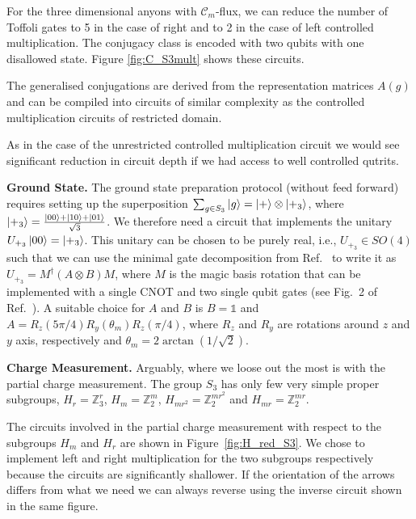 \documentclass[two column]{article}
\begin{document}
For the three dimensional anyons with $\mathcal{C}_m$-flux, we can reduce the number of Toffoli gates to 5 in the case of right and to 2 in the case of left controlled multiplication. The conjugacy class is encoded with two qubits with one disallowed state. Figure \ref{fig:C_S3mult} shows these circuits.

The generalised conjugations are derived from the representation matrices $A{(g)}$ and can be compiled into circuits of similar complexity as the controlled multiplication circuits of restricted domain.

As in the case of the unrestricted controlled multiplication circuit we would see significant reduction in circuit depth if we had access to well controlled qutrits.

\textbf{Ground State.}
The ground state preparation protocol (without feed forward) requires setting up the superposition $\sum_{g \in S_3} \ket{g}=\ket{+}\otimes \ket{+_3}$, where $\ket{+_3}=\frac{\ket{00}+\ket{10}+\ket{01}}{{\sqrt{3}} }$. We therefore need a circuit that implements the unitary $U_{+_3}\ket{00}= \ket{+_3}$. This unitary can be chosen to be purely real, i.e., $U_{+_3}\in SO(4)$ such that we can use the minimal gate decomposition from Ref.~\cite{decomp} to write it as $U_{+_3}=M^\dag(A\otimes B)M$, where $M$ is the magic basis rotation that can be implemented with a single CNOT and two single qubit gates  (see Fig.~2 of Ref.~\cite{decomp}). A suitable choice for $A$ and $B$ is $B=\mathbb 1$ and $A=R_z(5\pi/4)R_y(\theta_m) R_z(\pi/4)$, where $R_z$ and $R_y$ are rotations around $z$ and $y$ axis, respectively and $\theta_m=2 \arctan(1/\sqrt{2})$. 

\textbf{Charge Measurement.}
Arguably, where we loose out the most is with the partial charge measurement. The group $S_3$ has only few very simple proper subgroups, $H_r = \mathbb{Z}_3^r$, $H_m = \mathbb{Z}_2^m$, $H_{mr^2} = \mathbb{Z}_2^{mr^2}$ and $H_{mr} = \mathbb{Z}_2^{mr}$.

The circuits involved in the partial charge measurement with respect to the subgroups $H_m$ and $H_r$ are shown in Figure~\ref{fig:H_red_S3}. We chose to implement left and right multiplication for the two subgroups respectively because the circuits are significantly shallower. If the orientation of the arrows differs from what we need we can always reverse using the inverse circuit shown in the same figure.
\end{document}

